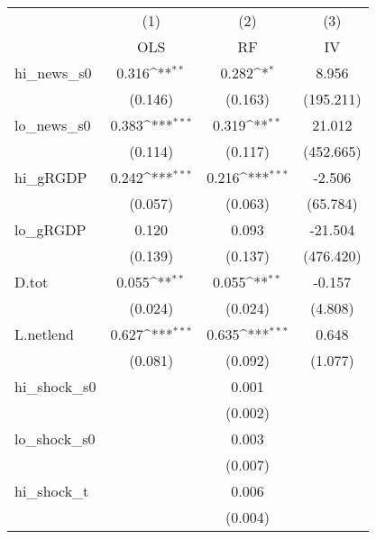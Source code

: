 {
\def\sym#1{\ifmmode^{#1}\else\(^{#1}\)\fi}
\begin{tabular}{l*{3}{c}}
\toprule
            &\multicolumn{1}{c}{(1)}&\multicolumn{1}{c}{(2)}&\multicolumn{1}{c}{(3)}\\
            &\multicolumn{1}{c}{OLS}&\multicolumn{1}{c}{RF}&\multicolumn{1}{c}{IV}\\
\midrule
hi\_news\_s0  &       0.316\sym{**} &       0.282\sym{*}  &       8.956         \\
            &     (0.146)         &     (0.163)         &   (195.211)         \\
\addlinespace
lo\_news\_s0  &       0.383\sym{***}&       0.319\sym{**} &      21.012         \\
            &     (0.114)         &     (0.117)         &   (452.665)         \\
\addlinespace
hi\_gRGDP    &       0.242\sym{***}&       0.216\sym{***}&      -2.506         \\
            &     (0.057)         &     (0.063)         &    (65.784)         \\
\addlinespace
lo\_gRGDP    &       0.120         &       0.093         &     -21.504         \\
            &     (0.139)         &     (0.137)         &   (476.420)         \\
\addlinespace
D.tot       &       0.055\sym{**} &       0.055\sym{**} &      -0.157         \\
            &     (0.024)         &     (0.024)         &     (4.808)         \\
\addlinespace
L.netlend   &       0.627\sym{***}&       0.635\sym{***}&       0.648         \\
            &     (0.081)         &     (0.092)         &     (1.077)         \\
\addlinespace
hi\_shock\_s0 &                     &       0.001         &                     \\
            &                     &     (0.002)         &                     \\
\addlinespace
lo\_shock\_s0 &                     &       0.003         &                     \\
            &                     &     (0.007)         &                     \\
\addlinespace
hi\_shock\_t  &                     &       0.006         &                     \\
            &                     &     (0.004)         &                     \\

\end{tabular}}
